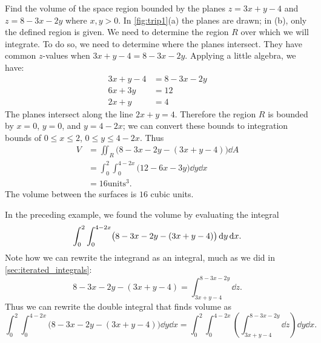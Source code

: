 \begin{example}\label{ex_trip1}%
Find the volume of the space region bounded by the planes $z=3x+y-4$ and $z=8-3x-2y$ where $x,y>0$. In \autoref{fig:trip1}(a) the planes are drawn; in (b), only the defined region is given.
\solution
We need to determine the region $R$ over which we will integrate. To do so, we need to determine where the planes intersect. They have common $z$-values when $3x+y-4=8-3x-2y$. Applying a little algebra, we have:
\begin{align*}
3x+y-4 &= 8-3x-2y\\
6x+3y &=12\\
2x+y &=4
\end{align*}
The planes intersect along the line $2x+y=4$. Therefore the region $R$ is bounded by $x=0$, $y=0$, and $y=4-2x$; we can convert these bounds to integration bounds of $0\leq x\leq 2$, $0\leq y\leq 4-2x$. Thus
\begin{align*}
V &= \iint_R \bigl(8-3x-2y-(3x+y-4)\bigr)\dd A \\
	&= \int_0^2\int_0^{4-2x} \bigl(12-6x-3y\bigr)\dd y\dd x\\
	&= 16\text{units}^3.
\end{align*}
The volume between the surfaces is $16$ cubic units.
\end{example}

In the preceding example, we found the volume by evaluating the integral
\[\displaystyle \int_0^2\int_0^{4-2x} \bigl(8-3x-2y-(3x+y-4)\bigr)\operatorname{d}\! y\operatorname{d}\! x.\]
Note how we can rewrite the integrand as an integral, much as we did in \autoref{sec:iterated_integrals}:
\[8-3x-2y-(3x+y-4) = \int_{3x+y-4}^{8-3x-2y}\dd z.\]
Thus we can rewrite the double integral that finds volume as
\[\int_0^2\int_0^{4-2x} \bigl(8-3x-2y-(3x+y-4)\bigr)\dd y\dd x = \int_0^2\int_0^{4-2x}\left(\int_{3x+y-4}^{8-3x-2y}\dd z\right)\dd y\dd x.\]

